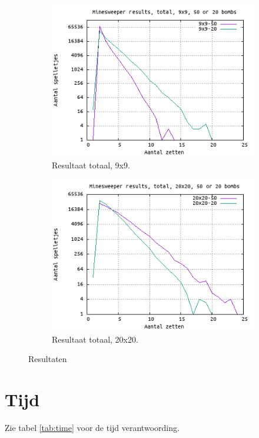 \documentclass[10pt]{article}
\begin{document}
\begin{figure}[H]
\begin{subfigure}{.49\textwidth}
    \includegraphics[width=1\linewidth]{plot_9_9_total}
    \caption{Resultaat totaal, 9x9. }
    \label{fig:plot_9_9_total}
  \end{subfigure}
  \begin{subfigure}{.49\textwidth}
    \centering
    \includegraphics[width=1\linewidth]{plot_20_20_total}
    \caption{Resultaat totaal, 20x20. }
    \label{fig:plot_20_20_total}
  \end{subfigure}
  \caption{Resultaten}
  \label{fig:plots}
\end{figure}

\section{Tijd}
Zie tabel \ref{tab:time} voor de tijd verantwoording.
\end{document}
